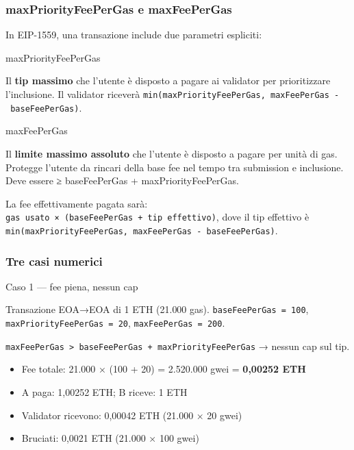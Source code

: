 \documentclass[
  italian,
  openany]{book}
\providecommand{\tightlist}{%
  \setlength{\itemsep}{0pt}\setlength{\parskip}{0pt}}
\begin{document}
\subsubsection{maxPriorityFeePerGas e
maxFeePerGas}\label{maxpriorityfeepergas-e-maxfeepergas}

In EIP-1559, una transazione include due parametri espliciti:

\begin{calloutdefinition}{maxPriorityFeePerGas}

Il \textbf{tip massimo} che l'utente è disposto a pagare ai validator
per prioritizzare l'inclusione. Il validator riceverà
\texttt{min(maxPriorityFeePerGas,\ maxFeePerGas\ -\ baseFeePerGas)}.

\end{calloutdefinition}

\begin{calloutdefinition}{maxFeePerGas}

Il \textbf{limite massimo assoluto} che l'utente è disposto a pagare per
unità di gas. Protegge l'utente da rincari della base fee nel tempo tra
submission e inclusione. Deve essere ≥ baseFeePerGas +
maxPriorityFeePerGas.

\end{calloutdefinition}

La fee effettivamente pagata sarà:
\texttt{gas\ usato\ ×\ (baseFeePerGas\ +\ tip\ effettivo)}, dove il tip
effettivo è
\texttt{min(maxPriorityFeePerGas,\ maxFeePerGas\ -\ baseFeePerGas)}.

\subsubsection{Tre casi numerici}\label{tre-casi-numerici}

\begin{callouttip}{Caso 1 — fee piena, nessun cap}

Transazione EOA→EOA di 1 ETH (21.000 gas).
\texttt{baseFeePerGas\ =\ 100}, \texttt{maxPriorityFeePerGas\ =\ 20},
\texttt{maxFeePerGas\ =\ 200}.

\texttt{maxFeePerGas\ \textgreater{}\ baseFeePerGas\ +\ maxPriorityFeePerGas}
→ nessun cap sul tip.

\begin{itemize}
\tightlist
\item
  Fee totale: 21.000 × (100 + 20) = 2.520.000 gwei = \textbf{0,00252
  ETH}
\item
  A paga: 1,00252 ETH; B riceve: 1 ETH
\item
  Validator ricevono: 0,00042 ETH (21.000 × 20 gwei)
\item
  Bruciati: 0,0021 ETH (21.000 × 100 gwei)
\end{itemize}

\end{callouttip}
\end{document}
